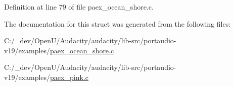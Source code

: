 Definition at line 79 of file paex\+\_\+ocean\+\_\+shore.\+c.



The documentation for this struct was generated from the following files\+:\begin{DoxyCompactItemize}
\item 
C\+:/\+\_\+dev/\+Open\+U/\+Audacity/audacity/lib-\/src/portaudio-\/v19/examples/\hyperlink{paex__ocean__shore_8c}{paex\+\_\+ocean\+\_\+shore.\+c}\item 
C\+:/\+\_\+dev/\+Open\+U/\+Audacity/audacity/lib-\/src/portaudio-\/v19/examples/\hyperlink{paex__pink_8c}{paex\+\_\+pink.\+c}\end{DoxyCompactItemize}
